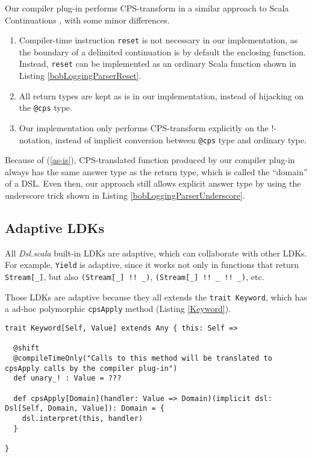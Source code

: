 Our compiler plug-in performs CPS-transform in a similar approach to Scala Continuations \cite{rompf2009implementing}, with some minor differences.

\begin{enumerate}
  
  \item Compiler-time instruction \lstinline{reset} is not necessary in our implementation, as the boundary of a delimited continuation is by default the enclosing function. Instead, \lstinline{reset} can be implemented as an ordinary Scala function shown in Listing \ref{bobLoggingParserReset}.
  
  \item All return types are kept as is in our implementation, instead of hijacking on the \lstinline{@cps} type.
  \label{as-is}

  \item Our implementation only performs CPS-transform explicitly on the !-notation, instead of implicit conversion between \lstinline{@cps} type and ordinary type.

\end{enumerate}

Because of (\ref{as-is}), CPS-translated function produced by our compiler plug-in always has the same answer type as the return type, which is called the ``domain'' of a DSL. Even then, our approach still allows explicit answer type by using the underscore trick shown in Listing \ref{bobLoggingParserUnderscore}.

\subsection{Adaptive LDKs}

All \textit{Dsl.scala} built-in LDKs are adaptive, which can collaborate with other LDKs. For example, \lstinline{Yield} is adaptive, since it works not only in functions that return \lstinline{Stream[_]}, but also \lstinline{(Stream[_] !! _)}, \lstinline{(Stream[_] !! _ !! _)}, etc. 

Those LDKs are adaptive because they all extends the \lstinline{trait Keyword}, which has a ad-hoc polymorphic \lstinline{cpsApply} method (Listing \ref{Keyword}).

\begin{lstlisting}[caption={The ad-hoc polymorphism in \lstinline{Keyword}},label={Keyword}]
trait Keyword[Self, Value] extends Any { this: Self =>

  @shift
  @compileTimeOnly("Calls to this method will be translated to cpsApply calls by the compiler plug-in")
  def unary_! : Value = ???

  def cpsApply[Domain](handler: Value => Domain)(implicit dsl: Dsl[Self, Domain, Value]): Domain = {
    dsl.interpret(this, handler)
  }

}
\end{lstlisting}


